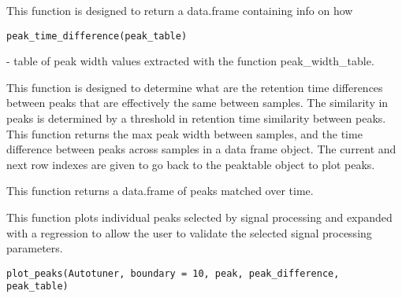 \documentclass[a4paper]{book}
\begin{document}
%
\begin{Description}\relax
This function is designed to return a data.frame containing info
on how
\end{Description}
%
\begin{Usage}
\begin{verbatim}
peak_time_difference(peak_table)
\end{verbatim}
\end{Usage}
%
\begin{Arguments}
\begin{ldescription}
\item[\code{peak\_table}] - table of peak width values extracted with the function
peak\_width\_table.
\end{ldescription}
\end{Arguments}
%
\begin{Details}\relax
This function is designed to determine what are the retention time
differences between peaks that are effectively the same between samples.
The similarity in peaks is determined by a threshold in retention time
similarity between peaks. This function returns the max peak width between
samples, and the time difference between peaks across samples in a data frame
object. The current and next row indexes are given to go back to the
peaktable object to plot peaks.
\end{Details}
%
\begin{Value}
This function returns a data.frame of peaks matched over time.
\end{Value}
%
\begin{Description}\relax
This function plots individual peaks selected by signal
processing and expanded with a regression to allow the user to validate the
selected signal processing parameters.
\end{Description}
%
\begin{Usage}
\begin{verbatim}
plot_peaks(Autotuner, boundary = 10, peak, peak_difference, peak_table)
\end{verbatim}
\end{Usage}
%
\end{document}

